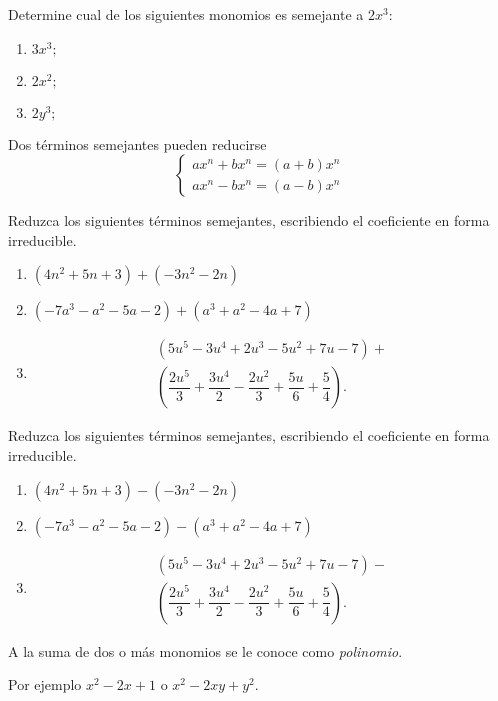 	\begin{problema}
		Determine cual de los siguientes monomios es semejante a $2x^{3}:$
		\begin{enumerate}
			\item $3x^{3};$
			\item $2x^{2};$
			\item $2y^{3};$
		\end{enumerate}
		
	\end{problema}
	



	Dos t\'erminos semejantes pueden reducirse 
	$$\begin{cases}
		ax^{n}+bx^{n}=\left( a+b \right)x^{n}\\
		ax^{n}-bx^{n}=\left( a-b \right)x^{n}
	\end{cases}
	$$



	\begin{problema}
		Reduzca los siguientes t\'erminos semejantes, escribiendo el coeficiente en forma irreducible.
		\begin{enumerate}
			\item $\left( 4n^{2}+5n+3 \right)+\left( -3n^{2}-2n \right)$
			\item $\left( -7a^{3}-a^{2}-5a-2 \right)+\left( a^{3}+a^{2}-4a+7 \right)$
			\item \begin{eqnarray*}
				\left(5u^{5}-3u^{4}+2u^{3}-5u^{2}+7u-7\right)+ \\
				\left( \dfrac{2u^{5}}{3}+\dfrac{3u^{4}}{2}-\dfrac{2u^{2}}{3}+\dfrac{5u}{6}+\dfrac{5}{4} \right).
			\end{eqnarray*}
			
		\end{enumerate}
		
	\end{problema}
	



	\begin{problema}
		Reduzca los siguientes t\'erminos semejantes, escribiendo el coeficiente en forma irreducible.
		\begin{enumerate}
			\item $\left( 4n^{2}+5n+3 \right)-\left( -3n^{2}-2n \right)$
			\item $\left( -7a^{3}-a^{2}-5a-2 \right)-\left( a^{3}+a^{2}-4a+7 \right)$
			\item \begin{eqnarray*}
				\left(5u^{5}-3u^{4}+2u^{3}-5u^{2}+7u-7\right)- \\
				\left( \dfrac{2u^{5}}{3}+\dfrac{3u^{4}}{2}-\dfrac{2u^{2}}{3}+\dfrac{5u}{6}+\dfrac{5}{4} \right).
			\end{eqnarray*}
			
		\end{enumerate}
		
	\end{problema}
	



	\begin{rem}
		A la suma de dos o más monomios se le conoce como \emph{polinomio}.
		
		Por ejemplo $x^{2}-2x+1$ o $x^{2}-2xy+y^{2}.$
		
	\end{rem}
	


